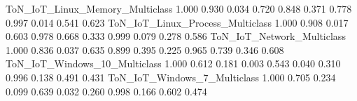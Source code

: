 ToN_IoT_Linux_Memory_Multiclass                                            1.000            0.930                                    0.034                           0.720           0.848                    0.371                                                     0.778                                     0.997                                     0.014                              0.541   0.623
ToN_IoT_Linux_Process_Multiclass                                           1.000            0.908                                    0.017                           0.603           0.978                    0.668                                                     0.333                                     0.999                                     0.079                              0.278   0.586
ToN_IoT_Network_Multiclass                                                 1.000            0.836                                    0.037                           0.635           0.899                    0.395                                                     0.225                                     0.965                                     0.739                              0.346   0.608
ToN_IoT_Windows_10_Multiclass                                              1.000            0.612                                    0.181                           0.003           0.543                    0.040                                                     0.310                                     0.996                                     0.138                              0.491   0.431
ToN_IoT_Windows_7_Multiclass                                               1.000            0.705                                    0.234                           0.099           0.639                    0.032                                                     0.260                                     0.998                                     0.166                              0.602   0.474